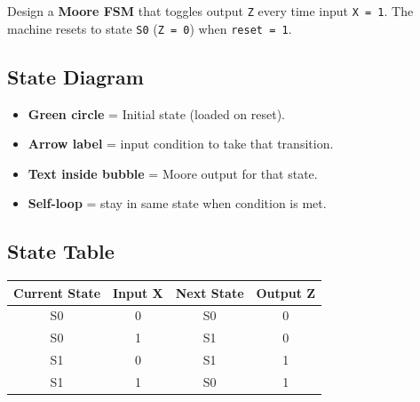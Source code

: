 \documentclass[12pt,a4paper]{article}
\begin{document}
Design a \textbf{Moore FSM} that toggles output \texttt{Z} every time input \texttt{X = 1}.
The machine resets to state \texttt{S0} (\texttt{Z = 0}) when \texttt{reset = 1}.

\subsection{State Diagram}

\begin{center}
\end{center}

\begin{tcolorbox}[notebox, title={Reading State Diagrams}]
  \begin{itemize}
    \item \textcolor{accentgreen}{\textbf{Green circle}} = Initial state (loaded on reset).
    \item \textbf{Arrow label} = input condition to take that transition.
    \item \textbf{Text inside bubble} = Moore output for that state.
    \item \textbf{Self-loop} = stay in same state when condition is met.
  \end{itemize}
\end{tcolorbox}

\subsection{State Table}

\begin{center}
\begin{tabular}{cccc}
  \toprule
  \textbf{Current State} & \textbf{Input X} & \textbf{Next State} & \textbf{Output Z} \\
  \midrule
  S0 & 0 & S0 & 0 \\
  S0 & 1 & S1 & 0 \\
  S1 & 0 & S1 & 1 \\
  S1 & 1 & S0 & 1 \\
  \bottomrule
\end{tabular}
\end{center}
\end{document}

